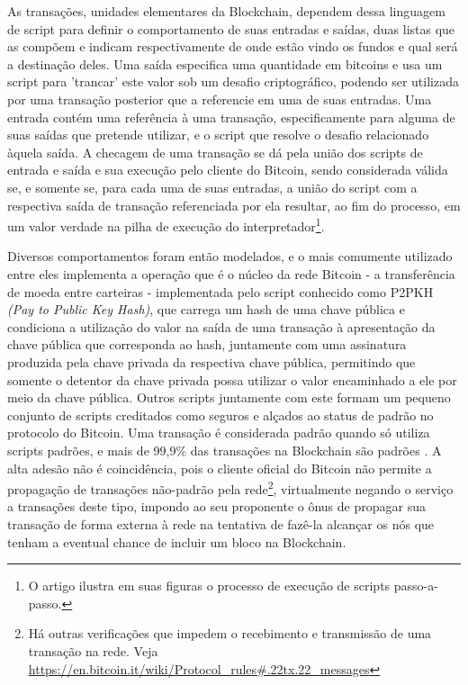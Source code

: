 \documentclass[a4paper,11pt]{article}
\begin{document}
As transações, unidades elementares da Blockchain, dependem dessa linguagem de script para definir o comportamento de suas entradas e saídas, duas listas que as compõem e indicam respectivamente de onde estão vindo os fundos e qual será a destinação deles.
Uma saída especifica uma quantidade em bitcoins e usa um script para 'trancar' este valor sob um desafio criptográfico, podendo ser utilizada por uma transação posterior que a referencie em uma de suas entradas.
Uma entrada contém uma referência à uma transação, especificamente para alguma de suas saídas que pretende utilizar, e o script que resolve o desafio relacionado àquela saída.
A checagem de uma transação se dá pela união dos scripts de entrada e saída e sua execução pelo cliente do Bitcoin, sendo considerada válida se, e somente se, para cada uma de suas entradas, a união do script com a respectiva saída de transação referenciada por ela resultar, ao fim do processo, em um valor verdade na pilha de execução do
interpretador\footnote{O artigo \cite{Bistarelli2019} ilustra em suas figuras o processo de execução de scripts passo-a-passo.}.

Diversos comportamentos foram então modelados, e o mais comumente utilizado entre eles implementa a operação que é o núcleo da rede Bitcoin - a transferência de moeda entre carteiras - implementada pelo script conhecido como P2PKH \emph{(Pay to Public Key Hash)}, que carrega um hash de uma chave pública e condiciona a utilização do valor na saída de uma transação à apresentação da chave pública que corresponda ao hash, juntamente com uma assinatura produzida pela chave privada da respectiva chave pública, permitindo que somente o detentor da chave privada possa utilizar o valor encaminhado a ele por meio da chave pública.
Outros scripts juntamente com este formam um pequeno conjunto de scripts creditados como seguros e alçados ao status de padrão no protocolo do Bitcoin.
Uma transação é considerada padrão quando só utiliza scripts padrões, e mais de 99,9\% das transações na Blockchain são padrões \cite{Bistarelli2019}.
A alta adesão não é coincidência, pois o cliente oficial do Bitcoin não permite a propagação de transações não-padrão pela
rede\footnote{Há outras verificações que impedem o recebimento e transmissão de uma transação na rede. Veja \url{https://en.bitcoin.it/wiki/Protocol_rules\#.22tx.22_messages}},
virtualmente negando o serviço a transações deste tipo, impondo ao seu proponente o ônus de propagar sua transação de forma externa à rede na tentativa de fazê-la alcançar os nós que tenham a eventual chance de incluir um bloco na Blockchain.
\end{document}
